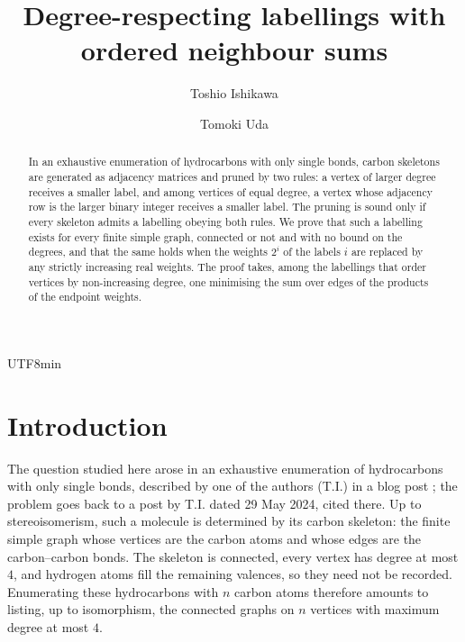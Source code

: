 \documentclass[reqno]{amsart}
\title{Degree-respecting labellings with ordered neighbour sums}
\author{Toshio Ishikawa}
\author{Tomoki Uda}
\date{}
\theoremstyle{definition}
\numberwithin{equation}{section}
\begin{document}
\begin{CJK*}{UTF8}{min}

\begin{abstract}
In an exhaustive enumeration of hydrocarbons with only single bonds, carbon
skeletons are generated as adjacency matrices and pruned by two rules: a vertex
of larger degree receives a smaller label, and among vertices of equal degree,
a vertex whose adjacency row is the larger binary integer receives a smaller
label. The pruning is sound only if every skeleton admits a labelling obeying
both rules. We prove that such a labelling exists for every finite simple
graph, connected or not and with no bound on the degrees, and that the same
holds when the weights \(2^i\) of the labels \(i\) are replaced by any
strictly increasing real weights. The proof takes, among the labellings that
order vertices by non-increasing degree, one minimising the sum over edges of
the products of the endpoint weights.
\end{abstract}

\maketitle

\section{Introduction}

The question studied here arose in an exhaustive enumeration of hydrocarbons
with only single bonds, described by one of the authors (T.I.) in a blog post
\cite{smooth-pudding-2024}; the problem goes back to a post by T.I. dated
29 May 2024, cited there. Up to stereoisomerism,
such a molecule is determined by its carbon skeleton: the finite simple graph whose vertices are
the carbon atoms and whose edges are the carbon--carbon bonds. The skeleton is
connected, every vertex has degree at most \(4\), and hydrogen atoms fill the
remaining valences, so they need not be recorded. Enumerating these
hydrocarbons with \(n\) carbon atoms therefore amounts to listing, up to
isomorphism, the connected graphs on \(n\) vertices with maximum degree at
most \(4\).


\end{CJK*}
\end{document}
